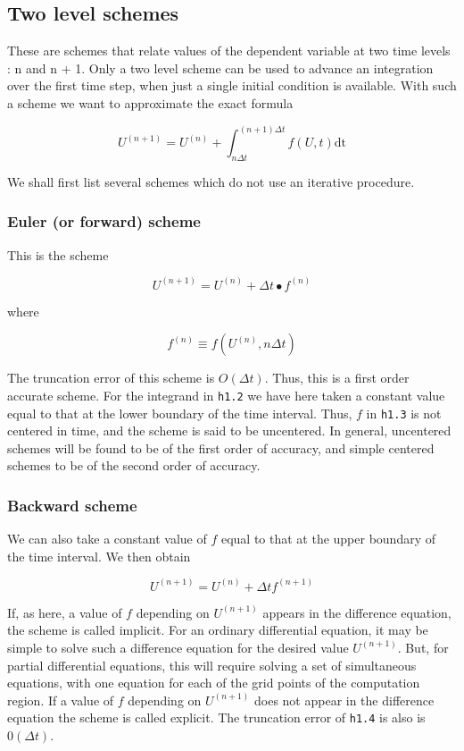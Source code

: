 \subsection{Two level schemes}\label{subsec:two-level-schemes}

These are schemes that relate values of the dependent variable at two
time levels : n and n + 1. Only a two level scheme can be used to
advance an integration over the first time step, when just a single
initial condition is available. With such a scheme we want to
approximate the exact formula

\[U^{( n + 1 )} = U^{\left( n \right)} + \int_{n\Delta t}^{(n+1)\Delta t}f\left( U,t \right)\text{dt}\]

We shall first list several schemes which do not use an iterative
procedure.

\subsubsection{Euler (or forward) scheme}\label{subsec:euler-scheme}

This is the scheme

\[U^{\left( n + 1 \right)} = U^{\left( n \right)} + \Delta t \bullet f^{\left( n \right)}\]

where

\[f^{\left( n \right)} \equiv f\left( U^{\left( n \right)},n\Delta t \right)\]

The truncation error of this scheme is \(O\left( \Delta t \right)\).
Thus, this is a first order accurate scheme. For the integrand in
\texttt{h1.2} we have here taken a constant value equal to that at the
lower boundary of the time interval. Thus, \(f\) in \texttt{h1.3} is not
centered in time, and the scheme is said to be uncentered. In general,
uncentered schemes will be found to be of the first order of accuracy,
and simple centered schemes to be of the second order of accuracy.

\subsubsection{Backward scheme}\label{subsubsec:backward-scheme}

We can also take a constant value of \(f\) equal to that at the upper
boundary of the time interval. We then obtain

\[U^{( n + 1 )} = U^{( n )} + \Delta t  f^{\left( n + 1 \right)}\]

If, as here, a value of \(f\) depending on \(U^{\left( n + 1 \right)}\)
appears in the difference equation, the scheme is called implicit. For
an ordinary differential equation, it may be simple to solve such a
difference equation for the desired value \(U^{\left( n + 1 \right)}\).
But, for partial differential equations, this will require solving a set
of simultaneous equations, with one equation for each of the grid points
of the computation region. If a value of \(f\) depending on
\(U^{\left( n + 1 \right)}\) does not appear in the difference equation
the scheme is called explicit. The truncation error of \texttt{h1.4} is
also is \(0\left( \Delta t \right)\).

